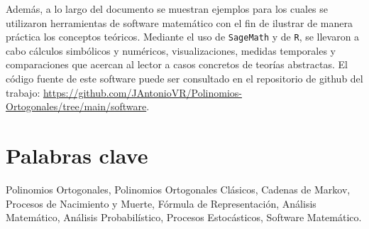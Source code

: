 Además, a lo largo del documento se muestran ejemplos para los cuales se utilizaron herramientas de software matemático con el fin de ilustrar de manera práctica los conceptos teóricos. Mediante el uso de \texttt{SageMath} y de \texttt{R}, se llevaron a cabo cálculos simbólicos y numéricos, visualizaciones, medidas temporales y comparaciones que acercan al lector a casos concretos de teorías abstractas. El código fuente de este software puede ser consultado en el repositorio de github del trabajo: \url{https://github.com/JAntonioVR/Polinomios-Ortogonales/tree/main/software}.


\section*{Palabras clave}

Polinomios Ortogonales, Polinomios Ortogonales Clásicos, Cadenas de Markov, Procesos de Nacimiento y Muerte, Fórmula de Representación, Análisis Matemático, Análisis Probabilístico, Procesos Estocásticos, Software Matemático.